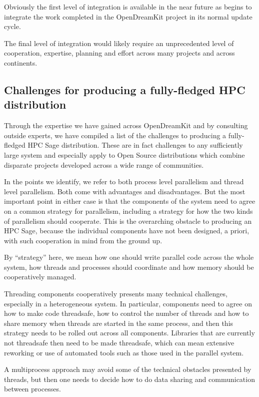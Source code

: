 \documentclass{deliverablereport}
\begin{document}
Obviously the first level of integration is available in the near future as \SageMath
begins to integrate the work completed in the OpenDreamKit project in its normal update
cycle.

The final level of integration would likely require an unprecedented level of
cooperation, expertise, planning and effort across many projects and across continents.

\subsection{Challenges for producing a fully-fledged HPC \SageMath distribution}

Through the expertise we have gained across OpenDreamKit and by consulting outside
experts, we have compiled a list of the challenges to producing a fully-fledged
HPC Sage distribution. These are in fact challenges to any sufficiently large system
and especially apply to Open Source distributions which combine disparate projects
developed across a wide range of communities.

In the points we identify, we refer to both process level parallelism and thread level
parallelism. Both come with advantages and disadvantages. But the most important point
in either case is that the components of the system need to agree on a common strategy
for parallelism, including a strategy for how the two kinds of parallelism should
cooperate. This is the overarching obstacle to producing an HPC Sage, because the individual
components have not been designed, a priori, with such cooperation in mind from the ground up.

By ``strategy'' here, we mean how one should write parallel code across the whole system, how
threads and processes should coordinate and how memory should be cooperatively managed.

Threading components cooperatively presents many technical challenges, especially in a
heterogeneous system. In particular, components need to agree on how to make code threadsafe,
how to control the number of threads and how to share memory when threads are started in the
same process, and then this strategy needs to be rolled out across all components. Libraries
that are currently not threadsafe then need to be made threadsafe, which can mean extensive
reworking or use of automated tools such as those used in the parallel \Singular system.

A multiprocess approach may avoid some of the technical obstacles presented by threads, but
then one needs to decide how to do data sharing and communication between processes.
\end{document}
